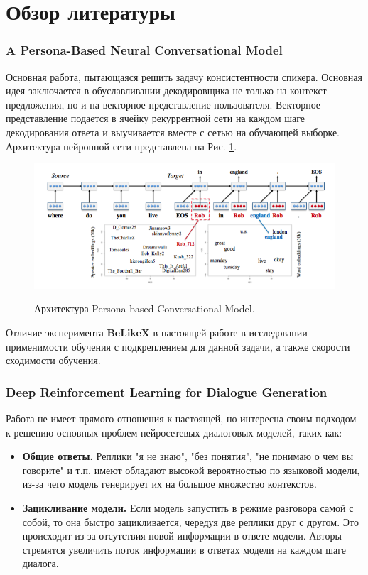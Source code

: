 \documentclass[12pt,a4paper]{amsart}
\begin{document}
\pagebreak
\section{Обзор литературы}

\subsubsection*{\textbf{A Persona-Based Neural Conversational Model}}

Основная работа, пытающаяся решить задачу консистентности спикера. Основная идея заключается в обуславливании декодировщика не только на контекст предложения, но и на векторное представление пользователя. Векторное представление подается в ячейку рекуррентной сети на каждом шаге декодирования ответа и выучивается вместе с сетью на обучающей выборке. Архитектура нейронной сети представлена на Рис. \ref{fig:persona-based}.

\begin{figure}[htbp!]
	\caption{Архитектура Persona-based Conversational Model.}
	\includegraphics[scale=0.7]{imgs/persona-based.png}
	\label{fig:persona-based}
	\centering
\end{figure}

Отличие эксперимента \textbf{BeLikeX} в настоящей работе в исследовании применимости обучения с подкреплением для данной задачи, а также скорости сходимости обучения.


\subsubsection*{\textbf{Deep Reinforcement Learning for Dialogue Generation}}

Работа не имеет прямого отношения к настоящей, но интересна своим подходом к решению основных проблем нейросетевых диалоговых моделей, таких как:

\begin{itemize}
	\item \textbf{Общие ответы.} Реплики "я не знаю", "без понятия", "не понимаю о чем вы говорите" и т.п. имеют обладают высокой вероятностью по языковой модели, из-за чего модель генерирует их на большое множество контекстов.
	\item \textbf{Зацикливание модели.} Если модель запустить в режиме разговора самой с собой, то она быстро зацикливается, чередуя две реплики друг с другом. Это происходит из-за отсутствия новой информации в ответе модели. Авторы стремятся увеличить поток информации в ответах модели на каждом шаге диалога.
\end{itemize}
\end{document}
